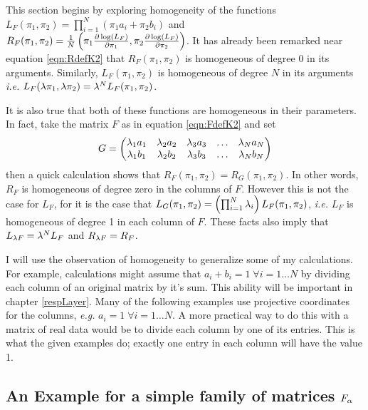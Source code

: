 \label{sect:simpleEg}
This section begins by exploring homogeneity of the functions \( L_F(\pi_1,\pi_2) =  \prod_{i=1}^N (\pi_1a_i+\pi_2b_i)\) and \( R_F(\pi_1,\pi_2) = \frac 1N \left(\pi_1\pdv{\log(L_F)}{\pi_1} ,\pi_2\pdv{\log(L_F)}{\pi_2} \right) \).  It has already been remarked near equation \eqref{eqn:RdefK2} that \( R_F(\pi_1,\pi_2) \) is homogeneous of degree 0 in its arguments.  Similarly, \( L_F(\pi_1,\pi_2) \) is homogeneous of degree \( N \) in its arguments \textit{i.e.} \( L_F(\lambda\pi_1,\lambda\pi_2) =  \lambda^NL_F(\pi_1,\pi_2)  \).

It is also true that both of these functions are homogeneous in their parameters. In fact, take the matrix \( F \) as in equation \ref{eqn:FdefK2} and set 
\begin{equation}\label{eqn:GdefK2hom}
G=
\begin{pmatrix}
\lambda_1a_1 & \lambda_2a_2 & \lambda_3a_3 & \ldots & \lambda_Na_N\\
\lambda_1b_1 & \lambda_2b_2 & \lambda_3b_3 & \ldots & \lambda_Nb_N
\end{pmatrix}
\end{equation} 
then a quick calculation shows that \( R_F(\pi_1,\pi_2) = R_G(\pi_1,\pi_2)\).  In other words, \( R_F \) is homogeneous of degree zero in the columns of \( F \).  However this is not the case for \( L_F \), for it is the case that \( L_G(\pi_1,\pi_2) = \left(\prod_{i=1}^{N}\lambda_i\right)L_F(\pi_1,\pi_2) \), \textit{i.e.} \( L_F \) is homogeneous of degree 1 in each column of \( F \).  These facts also imply that \( L_{\lambda F} = \lambda^{N}L_F \) and \( R_{\lambda F} = R_F \).

I will use the observation of homogeneity to generalize some of my calculations.  For example, calculations might assume that \( a_i + b_i = 1\;\forall i=1\ldots N \) by dividing each column of an original matrix by it's sum. This ability will be important in chapter \ref{respLayer}. Many of the following examples use projective coordinates for the columns, \textit{e.g.} \( a_i = 1\;\forall i=1\ldots N\).  A more practical way to do this with a matrix of real data would be to divide each column by one of its entries.  This is what the given examples do; exactly one entry in each column will have the value 1.

\subsection{An Example for a simple family of matrices \( F_\alpha \)}

